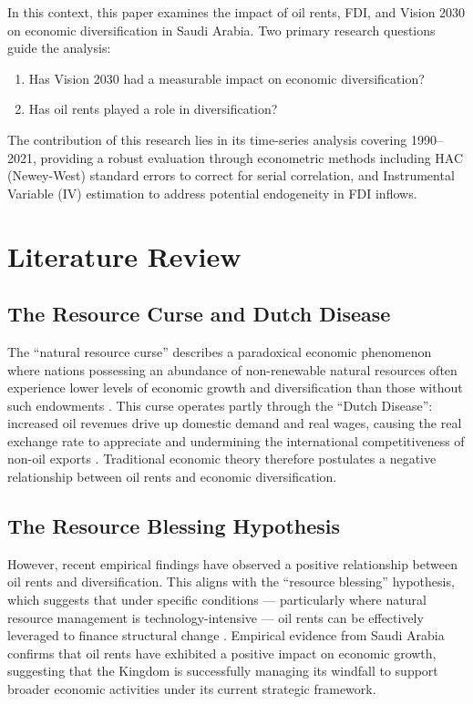 \documentclass[12pt, a4paper]{article}
\begin{document}
In this context, this paper examines the impact of oil rents, FDI, and Vision 2030 on economic diversification in Saudi Arabia. Two primary research questions guide the analysis:

\begin{enumerate}
    \item Has Vision 2030 had a measurable impact on economic diversification?
    \item Has oil rents played a role in diversification?
\end{enumerate}

The contribution of this research lies in its time-series analysis covering 1990--2021, providing a robust evaluation through econometric methods including HAC (Newey-West) standard errors to correct for serial correlation, and Instrumental Variable (IV) estimation to address potential endogeneity in FDI inflows.

\section{Literature Review}

\subsection{The Resource Curse and Dutch Disease}

The ``natural resource curse'' describes a paradoxical economic phenomenon where nations possessing an abundance of non-renewable natural resources often experience lower levels of economic growth and diversification than those without such endowments \citep{anser2020}. This curse operates partly through the ``Dutch Disease'': increased oil revenues drive up domestic demand and real wages, causing the real exchange rate to appreciate and undermining the international competitiveness of non-oil exports \citep{ashour2024}. Traditional economic theory therefore postulates a negative relationship between oil rents and economic diversification.

\subsection{The Resource Blessing Hypothesis}

However, recent empirical findings have observed a positive relationship between oil rents and diversification. This aligns with the ``resource blessing'' hypothesis, which suggests that under specific conditions --- particularly where natural resource management is technology-intensive --- oil rents can be effectively leveraged to finance structural change \citep{anser2020}. Empirical evidence from Saudi Arabia confirms that oil rents have exhibited a positive impact on economic growth, suggesting that the Kingdom is successfully managing its windfall to support broader economic activities under its current strategic framework.
\end{document}
